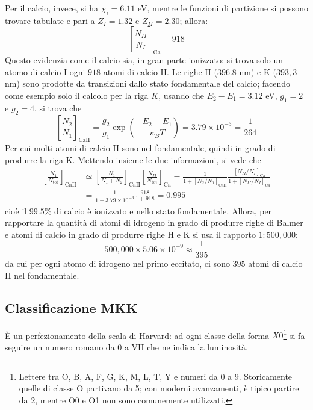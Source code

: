 \documentclass[11pt, a4paper]{scrartcl}
\theoremstyle{style}
\theoremstyle{style1}
\numberwithin{equation}{subsection}
\begin{document}
Per il calcio, invece, si ha $\chi _i = 6.11$ eV, mentre le funzioni di partizione si possono trovare tabulate e pari a $Z_I = 1.32$ e $Z_{I I} = 2.30$; allora:
\[
\left[ \frac{N_{I I}}{N_I} \right] _\mathrm{Ca} = 918
\] 
Questo evidenzia come il calcio sia, in gran parte ionizzato: si trova solo un atomo di calcio I ogni $918$ atomi di calcio II.
Le righe H ($396.8$ nm) e K ($393,3$ nm) sono prodotte da transizioni dallo stato fondamentale del calcio; facendo come esempio solo il calcolo per la riga $K$, usando che $E_2-E_1 = 3.12$ eV, $g_1 = 2$ e $g_2 = 4$, si trova che
\[
\left[ \frac{N_2}{N_1} \right] _{\mathrm{Ca II} } = \frac{g_2}{g_1} \exp\left(- \frac{E_2-E_1}{\kappa _B T}\right) = 3.79 \times 10^{-3} = \frac{1}{264}
\] 
Per cui molti atomi di calcio II sono nel fondamentale, quindi in grado di produrre la riga K.
Mettendo insieme le due informazioni, si vede che
\[
\begin{split}
	\left[ \frac{N_1}{N_\text{tot}} \right] _\mathrm{Ca II} &\simeq \left[ \frac{N_1}{N_1 + N_2} \right] _{\mathrm{Ca II} } \left[ \frac{N_{I I} }{N_\text{tot}} \right] _{\mathrm{Ca} } = \frac{1}{1+ \left[ N_2 / N_1 \right] _\mathrm{Ca II} } \frac{\left[ N_{I I } / N_I \right] _\mathrm{Ca} }{1 + \left[ N_{I I } / N_I \right] _{\mathrm{Ca} } }\\
								&= \frac{1}{1+ 3.79 \times 10^{-3}} \frac{918}{1+918}= 0.995
\end{split}
\] 
cio\`e il $99.5\%$ di calcio \`e ionizzato e nello stato fondamentale.
Allora, per rapportare la quantit\`a di atomi di idrogeno in grado di produrre righe di Balmer e atomi di calcio in grado di produrre righe H e K si usa il rapporto $1:500,000$:
\[
500,000 \times 5.06 \times 10^{-9}\approx \frac{1}{395}
\] 
da cui per ogni atomo di idrogeno nel primo eccitato, ci sono $395$ atomi di calcio II nel fondamentale.

\subsection{Classificazione MKK}

\`E un perfezionamento della scala di Harvard: ad ogni classe della forma $X0$\footnote{Lettere tra O, B, A, F, G, K, M, L, T, Y e numeri da $0$ a $9$. Storicamente quelle di classe O partivano da 5; con moderni avanzamenti, \`e tipico partire da 2, mentre O0 e O1 non sono comunemente utilizzati.} si fa seguire un numero romano da 0 a VII che ne indica la luminosit\`a.
\begin{table}[h!]
	\centering
\end{table}
\end{document}
